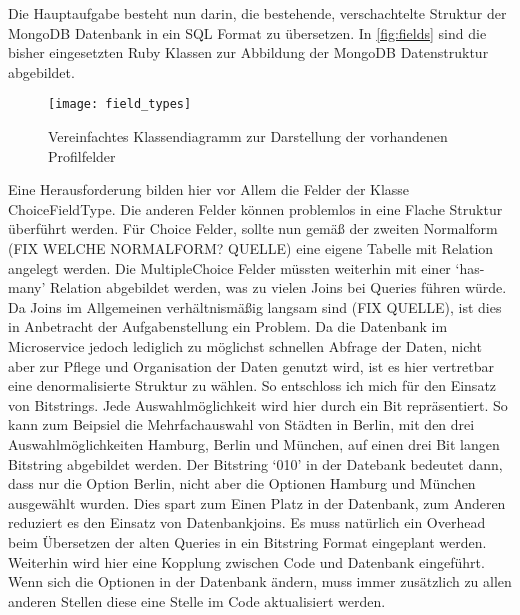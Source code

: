Die Hauptaufgabe besteht nun darin, die bestehende, verschachtelte Struktur der MongoDB Datenbank in ein SQL Format zu übersetzen.
In \autoref{fig:fields} sind die bisher eingesetzten Ruby Klassen zur Abbildung der MongoDB Datenstruktur abgebildet. 

\begin{figure}[!ht]
    \centering
    \caption{Vereinfachtes Klassendiagramm zur Darstellung der vorhandenen Profilfelder}
    \label{fig:fields}
    \texttt{[image: field\_types]}
\end{figure}

Eine Herausforderung bilden hier vor Allem die Felder der Klasse ChoiceFieldType. Die anderen Felder können problemlos in eine Flache Struktur überführt werden. Für Choice Felder, sollte nun gemäß der zweiten Normalform (FIX WELCHE NORMALFORM? QUELLE) eine eigene Tabelle mit Relation angelegt werden. Die MultipleChoice Felder müssten weiterhin mit einer `has-many' Relation abgebildet werden, was zu vielen Joins bei Queries führen würde. Da Joins im Allgemeinen verhältnismäßig langsam sind (FIX QUELLE), ist dies in Anbetracht der Aufgabenstellung ein Problem. Da die Datenbank im Microservice jedoch lediglich zu möglichst schnellen Abfrage der Daten, nicht aber zur Pflege und Organisation der Daten genutzt wird, ist es hier vertretbar eine denormalisierte Struktur zu wählen. So entschloss ich mich für den Einsatz von Bitstrings. Jede Auswahlmöglichkeit wird hier durch ein Bit repräsentiert. So kann zum Beipsiel die Mehrfachauswahl von Städten in Berlin, mit den drei Auswahlmöglichkeiten Hamburg, Berlin und München, auf einen drei Bit langen Bitstring abgebildet werden. Der Bitstring `010' in der Datebank bedeutet dann, dass nur die Option Berlin, nicht aber die Optionen Hamburg und München ausgewählt wurden. Dies spart zum Einen Platz in der Datenbank, zum Anderen reduziert es den Einsatz von Datenbankjoins. Es muss natürlich ein Overhead beim Übersetzen der alten Queries in ein Bitstring Format eingeplant werden. Weiterhin wird hier eine Kopplung zwischen Code und Datenbank eingeführt. Wenn sich die Optionen in der Datenbank ändern, muss immer zusätzlich zu allen anderen Stellen diese eine Stelle im Code aktualisiert werden.

